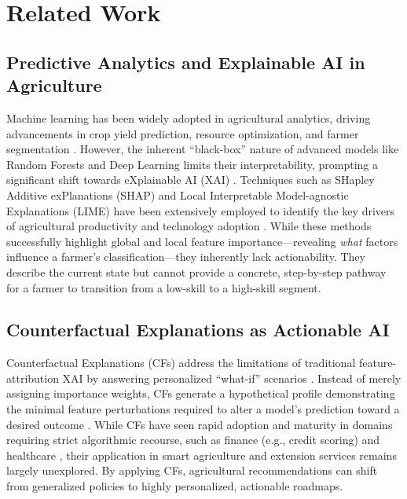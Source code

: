 \documentclass[12pt, a4paper]{article}
\begin{document}
\section{Related Work}\label{sec2}

\subsection{Predictive Analytics and Explainable AI in Agriculture}
Machine learning has been widely adopted in agricultural analytics, driving advancements in crop yield prediction, resource optimization, and farmer segmentation \cite{placeholder1_ml_agri}. However, the inherent ``black-box'' nature of advanced models like Random Forests and Deep Learning limits their interpretability, prompting a significant shift towards eXplainable AI (XAI) \cite{placeholder2_xai_need}. Techniques such as SHapley Additive exPlanations (SHAP) and Local Interpretable Model-agnostic Explanations (LIME) have been extensively employed to identify the key drivers of agricultural productivity and technology adoption \cite{placeholder3_shap_agri}. While these methods successfully highlight global and local feature importance—revealing \textit{what} factors influence a farmer's classification—they inherently lack actionability. They describe the current state but cannot provide a concrete, step-by-step pathway for a farmer to transition from a low-skill to a high-skill segment.

\subsection{Counterfactual Explanations as Actionable AI}
Counterfactual Explanations (CFs) address the limitations of traditional feature-attribution XAI by answering personalized ``what-if'' scenarios \cite{placeholder4_cf_intro}. Instead of merely assigning importance weights, CFs generate a hypothetical profile demonstrating the minimal feature perturbations required to alter a model's prediction toward a desired outcome \cite{placeholder5_cf_theory}. While CFs have seen rapid adoption and maturity in domains requiring strict algorithmic recourse, such as finance (e.g., credit scoring) and healthcare \cite{placeholder6_cf_finance}, their application in smart agriculture and extension services remains largely unexplored. By applying CFs, agricultural recommendations can shift from generalized policies to highly personalized, actionable roadmaps.
\end{document}
